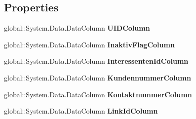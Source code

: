 \subsection*{Properties}
\begin{DoxyCompactItemize}
\item 
global\+::\+System.\+Data.\+Data\+Column {\bfseries U\+I\+D\+Column}\hypertarget{class_products_1_1_data_1_1ds_sage_1_1_notiz_data_table_afae73ec083243606a635171ed0cdfc2c}{}\label{class_products_1_1_data_1_1ds_sage_1_1_notiz_data_table_afae73ec083243606a635171ed0cdfc2c}

\item 
global\+::\+System.\+Data.\+Data\+Column {\bfseries Inaktiv\+Flag\+Column}\hypertarget{class_products_1_1_data_1_1ds_sage_1_1_notiz_data_table_a83593f1579fe6385272ab761a77792d1}{}\label{class_products_1_1_data_1_1ds_sage_1_1_notiz_data_table_a83593f1579fe6385272ab761a77792d1}

\item 
global\+::\+System.\+Data.\+Data\+Column {\bfseries Interessenten\+Id\+Column}\hypertarget{class_products_1_1_data_1_1ds_sage_1_1_notiz_data_table_ae90d857353a5de8952328c69740ee48c}{}\label{class_products_1_1_data_1_1ds_sage_1_1_notiz_data_table_ae90d857353a5de8952328c69740ee48c}

\item 
global\+::\+System.\+Data.\+Data\+Column {\bfseries Kundennummer\+Column}\hypertarget{class_products_1_1_data_1_1ds_sage_1_1_notiz_data_table_ac9ce320e1fc88a6e45cdb29e8f182b6f}{}\label{class_products_1_1_data_1_1ds_sage_1_1_notiz_data_table_ac9ce320e1fc88a6e45cdb29e8f182b6f}

\item 
global\+::\+System.\+Data.\+Data\+Column {\bfseries Kontaktnummer\+Column}\hypertarget{class_products_1_1_data_1_1ds_sage_1_1_notiz_data_table_ad834c3cfeb54c69aff42b18954fc2ac3}{}\label{class_products_1_1_data_1_1ds_sage_1_1_notiz_data_table_ad834c3cfeb54c69aff42b18954fc2ac3}

\item 
global\+::\+System.\+Data.\+Data\+Column {\bfseries Link\+Id\+Column}\hypertarget{class_products_1_1_data_1_1ds_sage_1_1_notiz_data_table_aab7813fe564cdbfd55cdee4a1332d45c}{}\label{class_products_1_1_data_1_1ds_sage_1_1_notiz_data_table_aab7813fe564cdbfd55cdee4a1332d45c}


\end{DoxyCompactItemize}
